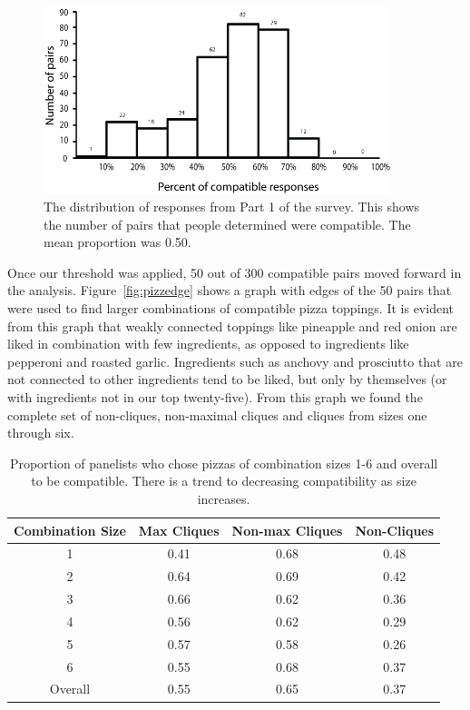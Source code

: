 \begin{figure}[h!]
\caption[The distribution of responses from Part 1 of the survey.]{The distribution of responses from  Part 1 of the survey.  This shows the number of pairs that people determined were compatible.  The mean proportion was 0.50.}
\label{fig:pizzsize}
\centering
\includegraphics[width=0.9\textwidth]{./img/Figure42.png}
\end{figure}

Once our threshold was applied, 50 out of 300 compatible pairs moved forward in the analysis.  Figure~\ref{fig:pizzedge} shows a graph with edges of the 50 pairs that were used to find larger combinations of compatible pizza toppings. It is evident from this graph that weakly connected toppings like pineapple and red onion are liked in combination with few ingredients, as opposed to ingredients like pepperoni and roasted garlic.  Ingredients such as anchovy and prosciutto that are not connected to other ingredients tend to be liked, but only by themselves (or with ingredients not in our top twenty-five).  From this graph we found the complete set of non-cliques, non-maximal cliques and cliques from sizes one through six.

\begin{table}[h!b!p!]
\caption[Proportion of panelists who chose pizzas of combination sizes 1-6 and overall to be compatible.]{Proportion of panelists who chose pizzas of combination sizes 1-6 and overall to be compatible.  There is a trend to decreasing compatibility as size increases.  }
\label{tab:pizzcompat}
\centering
\begin{tabular}{cccc}
\toprule
{\bf Combination Size} & {\bf Max Cliques} & {\bf Non-max Cliques} & {\bf Non-Cliques}  \\
\midrule
1 & 0.41 & 0.68 & 0.48 \\
2 &  0.64 & 0.69 & 0.42 \\
3 &  0.66 & 0.62 & 0.36 \\
4 &  0.56 & 0.62 & 0.29 \\
5 &  0.57 & 0.58 & 0.26 \\
6 & 0.55 & 0.68 & 0.37 \\
\midrule
Overall & 0.55 & 0.65 & 0.37 \\
\bottomrule
\end{tabular}
\end{table}

